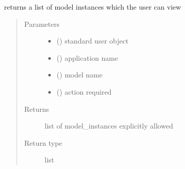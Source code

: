 \documentclass[letterpaper,10pt,english]{sphinxmanual}
\begin{document}
\begin{fulllineitems}
\label{\detokenize{rbac:rbac.core.rbac_user_allowed_for_model}}
returns a list of model instances which the user can view
\begin{quote}\begin{description}
\item[{Parameters}] \leavevmode\begin{itemize}
\item {} 
 ({\hyperref[\detokenize{accounts:accounts.models.User}]{}}) \textendash{} standard user object

\item {} 
 () \textendash{} application name

\item {} 
 () \textendash{} model name

\item {} 
 () \textendash{} action required

\end{itemize}

\item[{Returns}] \leavevmode
list of model\_instances explicitly allowed

\item[{Return type}] \leavevmode
list

\end{description}\end{quote}

\end{fulllineitems}

\end{document}
